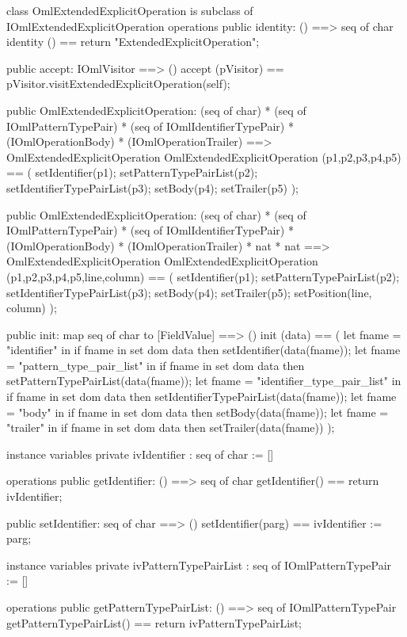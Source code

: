 \begin{vdm_al}
class OmlExtendedExplicitOperation is subclass of IOmlExtendedExplicitOperation
operations
  public identity: () ==> seq of char
  identity () == return "ExtendedExplicitOperation";

  public accept: IOmlVisitor ==> ()
  accept (pVisitor) == pVisitor.visitExtendedExplicitOperation(self);

  public OmlExtendedExplicitOperation:
    (seq of char) *
    (seq of IOmlPatternTypePair) *
    (seq of IOmlIdentifierTypePair) *
    (IOmlOperationBody) *
    (IOmlOperationTrailer) ==> OmlExtendedExplicitOperation
  OmlExtendedExplicitOperation (p1,p2,p3,p4,p5) == 
    ( setIdentifier(p1);
      setPatternTypePairList(p2);
      setIdentifierTypePairList(p3);
      setBody(p4);
      setTrailer(p5) );

  public OmlExtendedExplicitOperation:
    (seq of char) *
    (seq of IOmlPatternTypePair) *
    (seq of IOmlIdentifierTypePair) *
    (IOmlOperationBody) *
    (IOmlOperationTrailer) *
    nat *
    nat ==> OmlExtendedExplicitOperation
  OmlExtendedExplicitOperation (p1,p2,p3,p4,p5,line,column) == 
    ( setIdentifier(p1);
      setPatternTypePairList(p2);
      setIdentifierTypePairList(p3);
      setBody(p4);
      setTrailer(p5);
      setPosition(line, column) );

  public init: map seq of char to [FieldValue] ==> ()
  init (data) ==
    ( let fname = "identifier" in
        if fname in set dom data
        then setIdentifier(data(fname));
      let fname = "pattern_type_pair_list" in
        if fname in set dom data
        then setPatternTypePairList(data(fname));
      let fname = "identifier_type_pair_list" in
        if fname in set dom data
        then setIdentifierTypePairList(data(fname));
      let fname = "body" in
        if fname in set dom data
        then setBody(data(fname));
      let fname = "trailer" in
        if fname in set dom data
        then setTrailer(data(fname)) );

instance variables
  private ivIdentifier : seq of char := []

operations
  public getIdentifier: () ==> seq of char
  getIdentifier() == return ivIdentifier;

  public setIdentifier: seq of char ==> ()
  setIdentifier(parg) == ivIdentifier := parg;

instance variables
  private ivPatternTypePairList : seq of IOmlPatternTypePair := []

operations
  public getPatternTypePairList: () ==> seq of IOmlPatternTypePair
  getPatternTypePairList() == return ivPatternTypePairList;


\end{vdm_al}
